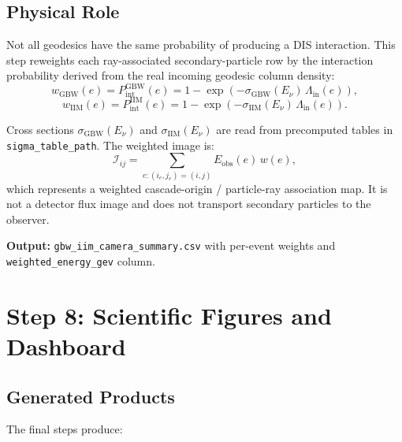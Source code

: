 \documentclass[11pt,a4paper]{article}
\begin{document}
\subsection{Physical Role}

Not all geodesics have the same probability of producing a DIS interaction. This step reweights each ray-associated secondary-particle row by the interaction probability derived from the real incoming geodesic column density:
\begin{equation}
  w_\mathrm{GBW}(e) = P_\mathrm{int}^\mathrm{GBW}(e) = 1 - \exp\!\left(-\sigma_\mathrm{GBW}(E_\nu)\,\Lambda_\mathrm{in}(e)\right),
  \label{eq:weight_gbw}
\end{equation}
\begin{equation}
  w_\mathrm{IIM}(e) = P_\mathrm{int}^\mathrm{IIM}(e) = 1 - \exp\!\left(-\sigma_\mathrm{IIM}(E_\nu)\,\Lambda_\mathrm{in}(e)\right).
  \label{eq:weight_iim}
\end{equation}

Cross sections $\sigma_\mathrm{GBW}(E_\nu)$ and $\sigma_\mathrm{IIM}(E_\nu)$ are read from precomputed tables in \texttt{sigma\_table\_path}. The weighted image is:
\begin{equation}
  \mathcal{I}_{ij} = \sum_{e: (i_e, j_e) = (i,j)} E_\mathrm{obs}(e)\,w(e),
  \label{eq:image}
\end{equation}
which represents a weighted cascade-origin / particle-ray association map. It is not a detector flux image and does not transport secondary particles to the observer.

\textbf{Output:} \texttt{gbw\_iim\_camera\_summary.csv} with per-event weights and \texttt{weighted\_energy\_gev} column.

\section{Step 8: Scientific Figures and Dashboard}
\label{sec:output}

\subsection{Generated Products}

The final steps produce:
\end{document}
